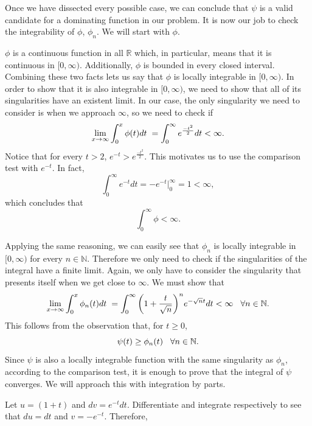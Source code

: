 \documentclass[12pt]{article}
\begin{document}
\vspace{4mm}

\noindent Once we have dissected every possible case, we can conclude that $\psi$ is a valid candidate for a dominating function in our problem. It is now our job to check the integrability of $\phi$, $\phi_n$. We will start with $\phi$.

\vspace{4mm}

\noindent $\phi$ is a continuous function in all $\mathbb{R}$ which, in particular, means that it is continuous in $[0,\infty)$. Additionally, $\phi$ is bounded in every closed interval. Combining these two facts lets us say that $\phi$ is locally integrable in $[0,\infty)$. In order to show that it is also integrable in $[0,\infty)$, we need to show that all of its singularities have an existent limit. In our case, the only singularity we need to consider is when we approach $\infty$, so we need to check if $$\lim_{x\to\infty}\int_0^x\phi(t)dt\hspace{1mm}=\int_0^\infty e^{\frac{-t^2}{2}}dt<\infty.$$ Notice that for every $t>2$, $e^{-t}>e^{\frac{-t^2}{2}}$. This motivates us to use the comparison test with $e^{-t}$. In fact, $$\int_0^\infty e^{-t}dt=-e^{-t}\bigg|_0^\infty=1<\infty,$$ which concludes that $$\int_0^\infty \phi<\infty.$$

\vspace{4mm}

\noindent Applying the same reasoning, we can easily see that $\phi_n$ is locally integrable in $[0,\infty)$ for every $n\in\mathbb{N}$. Therefore we only need to check if the singularities of the integral have a finite limit. Again, we only have to consider the singularity that presents itself when we get close to $\infty$. We must show that $$\lim_{x\to\infty}\int_0^x\phi_n(t)dt\hspace{1mm}=\int_0^\infty\bigg(1+\frac{t}{\sqrt{n}}\bigg)^ne^{-\sqrt{n}t}dt<\infty\hspace{3mm}\forall n\in\mathbb{N}.$$ This follows from the observation that, for $t\geq0$, $$\psi(t)\geq\phi_n(t)\hspace{3mm}\forall n\in\mathbb{N}.$$ Since $\psi$ is also a locally integrable function with the same singularity as $\phi_n$, according to the comparison test, it is enough to prove that the integral of $\psi$ converges. We will approach this with integration by parts.

\vspace{3mm}

\noindent Let $u=(1+t)$ and $dv=e^{-t}dt$. Differentiate and integrate respectively to see that $du=dt$ and $v=-e^{-t}$. Therefore, 
\end{document}
